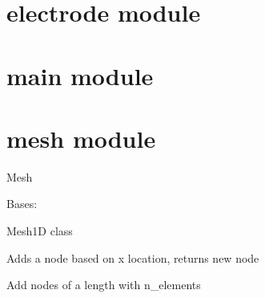 \documentclass[letterpaper,10pt,english]{sphinxmanual}
\begin{document}
\section{electrode module}
\label{\detokenize{electrode:electrode-module}}\label{\detokenize{electrode::doc}}

\section{main module}
\label{\detokenize{main:main-module}}\label{\detokenize{main::doc}}

\section{mesh module}
\label{\detokenize{mesh:module-mesh}}\label{\detokenize{mesh:mesh-module}}\label{\detokenize{mesh::doc}}
\sphinxAtStartPar
Mesh

\begin{fulllineitems}
\label{\detokenize{mesh:mesh.Mesh1D}}
\sphinxAtStartPar
Bases: 

\sphinxAtStartPar
Mesh1D class

\begin{fulllineitems}
\label{\detokenize{mesh:mesh.Mesh1D.add_node}}
\sphinxAtStartPar
Adds a node based on x location, returns new node

\end{fulllineitems}


\begin{fulllineitems}
\label{\detokenize{mesh:mesh.Mesh1D.add_nodes}}
\sphinxAtStartPar
Add nodes of a length with n\_elements

\end{fulllineitems}


\end{fulllineitems}
\end{document}

